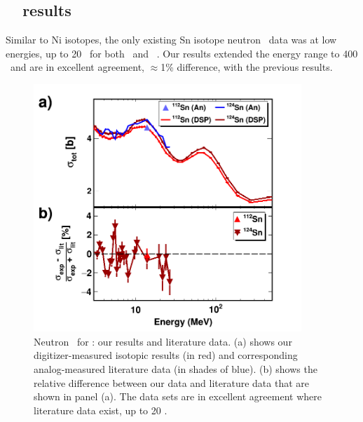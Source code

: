 \subsection{\snTwelveFour\ \tot\ results}
Similar to Ni isotopes, the only existing Sn isotope neutron \tot\ data was at
low energies, up to 20 \mega\electronvolt\ for both \snTwelve\ and \snFour\ \cite{Harper1982, Timokhov1989, 
Rapaport1980, Dukarevich1967}. Our results extended the energy range to 400 \mega\electronvolt\ and are
in excellent agreement, $\approx$1\% difference, with the previous results.
\begin{figure}[tb]
    \centering
    \includegraphics[width=0.9\textwidth]{figures/TwoPanelSn.png}
    \caption[Neutron \tot\ for \snTwelveFour: our results and literature data]
    {
        Neutron \tot\ for \snTwelveFour: our results and literature data.
        (a) shows our digitizer-measured isotopic results (in red) and
        corresponding analog-measured literature data \cite{Harper1982, Timokhov1989, 
        Rapaport1980, Dukarevich1967} (in shades of blue).
        (b) shows the relative difference between our data
        and literature data that are shown in panel (a). The data sets are in
        excellent agreement where literature data exist, up to 20 \mega\electronvolt.
    }
    \label{TwoPanelSn}
\end{figure}

